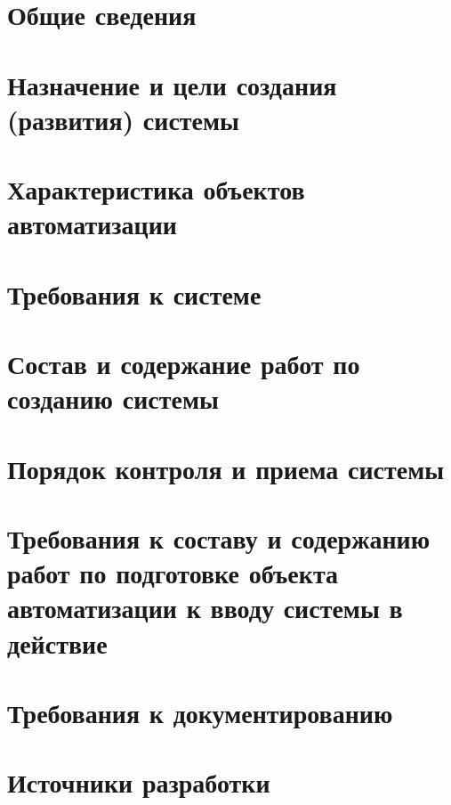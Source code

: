 

\titleformat{\section}{\normalfont\normalsize}{\thesection}{1.0em}{}
\titleformat{\subsection}{\normalfont\normalsize}{\thesubsection}{1.0em}{}
\titleformat{\subsubsection}{\normalfont\normalsize}{\thesubsubsection}{1.0em}{}

\newpage
\section{Общие сведения}


\section{Назначение и цели создания (развития) системы}


\section{Характеристика объектов автоматизации}


\section{Требования к системе}


\section{Состав и содержание работ по созданию системы}


\section{Порядок контроля и приема системы}


\section{Требования к составу и содержанию работ по подготовке объекта автоматизации к вводу системы в действие}


\section{Требования к документированию}


\section{Источники разработки}


\label{lastpage}
